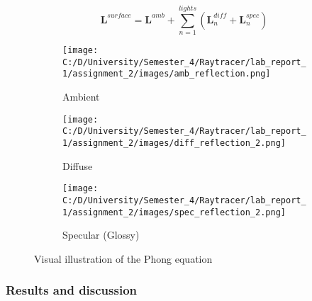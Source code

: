 \documentclass{article}
\begin{document}
	\begin{equation}
		\pmb{L}^{surface}= \pmb{L}^{amb} + \sum_{n=1}^{lights} (\pmb{L}_n^{diff} + \pmb{L}_n^{spec})
	\end{equation}
	
	
	\begin{figure}[ht]
		\begin{center}
			\begin{subfigure}{.3\textwidth}
				\centering
				\texttt{[image: C:/D/University/Semester\_4/Raytracer/lab\_report\_1/assignment\_2/images/amb\_reflection.png]}  
				\caption{Ambient}
				\label{fig:sub-first}
			\end{subfigure}
			\begin{subfigure}{.3\textwidth}
				\centering
				\texttt{[image: C:/D/University/Semester\_4/Raytracer/lab\_report\_1/assignment\_2/images/diff\_reflection\_2.png]}  
				\caption{Diffuse}
				\label{fig:sub-second}
			\end{subfigure}
			\begin{subfigure}{.3\textwidth}
				\centering
				\texttt{[image: C:/D/University/Semester\_4/Raytracer/lab\_report\_1/assignment\_2/images/spec\_reflection\_2.png]}  
				\caption{ Specular (Glossy)}
				\label{fig:sub-third}
			\end{subfigure}
			
			\caption{Visual illustration of the Phong equation}
			\label{fig:6}
		\end{center}
	\end{figure}
	
	\subsubsection{Results and discussion}
	
\end{document}
